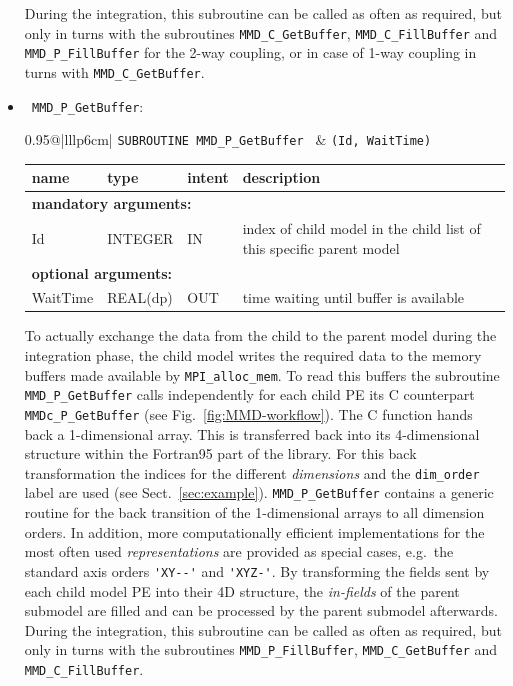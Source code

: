 \documentclass[twoside]{article}
\begin{document}
\begin{itemize}
During the integration, this subroutine can be called as often as
required, but only in turns with the
subroutines \verb|MMD_C_GetBuffer|, \verb|MMD_C_FillBuffer|
and \verb|MMD_P_FillBuffer| for the 2-way coupling, or in case of 1-way
coupling in turns with \verb|MMD_C_GetBuffer|. 
 
\item  \verb| MMD_P_GetBuffer|:\\
\vspace*{-0.3cm}

\begin{tabular*}{0.95\textwidth}{@{\extracolsep\fill}|lllp{6cm}|}
\hline
{}
{\tt SUBROUTINE MMD\_P\_GetBuffer } &
{\tt (Id, WaitTime)}\\
\hline
\end{tabular*}
\begin{tabular*}{0.95\textwidth}{@{\extracolsep\fill}|lllp{6.5cm}|}
name & type & intent & description\\
\hline
\multicolumn{4}{|l|}{\bf mandatory arguments:}\\
Id & {\footnotesize INTEGER} & IN &  index of child model in the child list of this specific parent model\\
\multicolumn{4}{|l|}{\bf optional arguments:}\\
WaitTime & REAL(dp) & OUT & time waiting until buffer is available \\
\hline
\end{tabular*}
\smallskip

To actually exchange the data from the child to the parent model during
the integration phase, the child model writes the required data to the
memory buffers made available by \verb|MPI_alloc_mem|.
To read this buffers the subroutine \verb|MMD_P_GetBuffer| calls
independently for each child PE its C counterpart  
\verb|MMDc_P_GetBuffer| (see Fig.\ \ref{fig:MMD-workflow}). 
The C function hands back a 1-dimensional array. This is transferred back into 
its 4-dimensional structure within the Fortran95 part of the library.
 For this back transformation the indices for the different {\it
 dimensions} and  
the \verb|dim_order| label are used (see Sect.\ \ref{sec:example}).
\verb|MMD_P_GetBuffer| contains a generic routine for the back transition
of the 1-dimensional arrays to all dimension orders. In addition, more 
computationally efficient implementations for the most often used {\it
representations} are provided as special cases, e.g.\ the standard axis orders
  \verb|'XY--'| and \verb|'XYZ-'|.
By transforming the fields sent by each child model PE into their
 4D structure,
 the {\it in-fields} of the parent submodel are filled and can be processed 
by the parent submodel afterwards.
During the integration, this subroutine can be called as often as
required, but only in turns with the
subroutines \verb|MMD_P_FillBuffer|, \verb|MMD_C_GetBuffer|
and \verb|MMD_C_FillBuffer|. 


\end{itemize}
\end{document}

